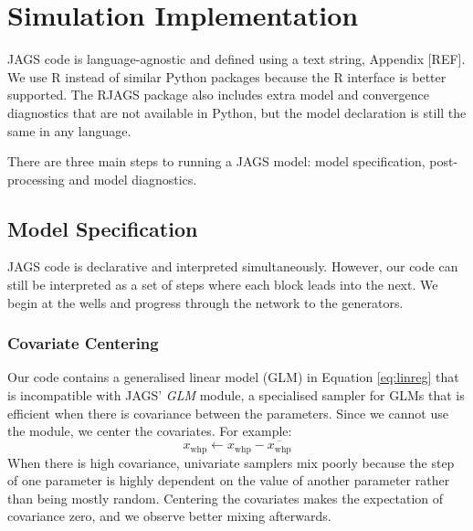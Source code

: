 \documentclass[a4paper, 12pt]{article}
\begin{document}

\section{Simulation Implementation}
JAGS code is language-agnostic and defined using a text string, Appendix [REF]. We use R instead of similar Python packages because the R interface is better supported. The RJAGS package also includes extra model and convergence diagnostics that are not available in Python, but the model declaration is still the same in any language.

There are three main steps to running a JAGS model: model specification, post-processing and model diagnostics.

\subsection{Model Specification}
JAGS code is declarative and interpreted simultaneously. However, our code can still be interpreted as a set of steps where each block leads into the next. We begin at the wells and progress through the network to the generators.

\subsubsection{Covariate Centering}
Our code contains a generalised linear model (GLM) in Equation \ref{eq:linreg} that is incompatible with JAGS' \emph{GLM} module, a specialised sampler for GLMs that is efficient when there is covariance between the parameters. Since we cannot use the module, we center the covariates. For example:
\begin{equation}
x_\text{whp} \leftarrow x_\text{whp} - \overline{x_\text{whp}}
\end{equation}
When there is high covariance, univariate samplers mix poorly because the step of one parameter is highly dependent on the value of another parameter rather than being mostly random. Centering the covariates makes the expectation of covariance zero, and we observe better mixing afterwards.
\end{document}
